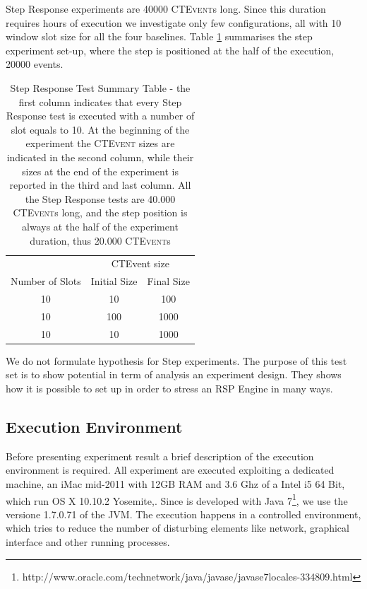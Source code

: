 Step Response experiments are 40000 \textsc{CTEvent}s long. Since this duration requires hours of execution we investigate only few configurations, all with 10 window slot size for all the four baselines. Table \ref{tab:steptests} summarises the step experiment set-up, where the step is positioned at the half of the execution, 20000 events.
\begin{table}[htb]
\centering
 \begin{tabular}{c|c|c}
	  	\hline
	  	&\multicolumn{2}{c}{CTEvent size}  \\
		Number of Slots & Initial Size & Final Size\\
		\hline
		\hline
		 10 & 10 & 100\\
		 10 & 100 & 1000\\
		 10 & 10 & 1000\\
		\hline 
 \end{tabular}
 \caption[Step Response Tests Summary Table]{Step Response Test Summary Table -  the first column indicates that every Step Response test is executed with a number of slot equals to 10. At the beginning of the experiment the \textsc{CTEvent} sizes are indicated in the second column, while their sizes at the end of the experiment is reported in the third and last column. All the Step Response tests are 40.000 \textsc{CTEvent}s long, and the step position is always at the half of the experiment duration, thus 20.000 \textsc{CTEvent}s}
\label{tab:steptests}
\end{table}

We do not formulate hypothesis for Step experiments. The purpose of this test set is to show \name potential in term of analysis an experiment design. They shows how it is possible to set up \name in order to stress an RSP Engine in many ways.

\subsection{Execution Environment}\label{sec:execution-environment}

Before presenting experiment result a brief description of the execution environment is required. All experiment are executed exploiting a dedicated machine, an iMac mid-2011 with 12GB RAM and 3.6 Ghz of a Intel i5 64 Bit, which run OS X 10.10.2 Yosemite,. Since \name is developed with Java 7\footnote{http://www.oracle.com/technetwork/java/javase/javase7locales-334809.html}, we use the versione 1.7.0.71 of the JVM.
The execution happens in a controlled environment, which tries to reduce the number of disturbing elements like network, graphical interface and other running processes.

